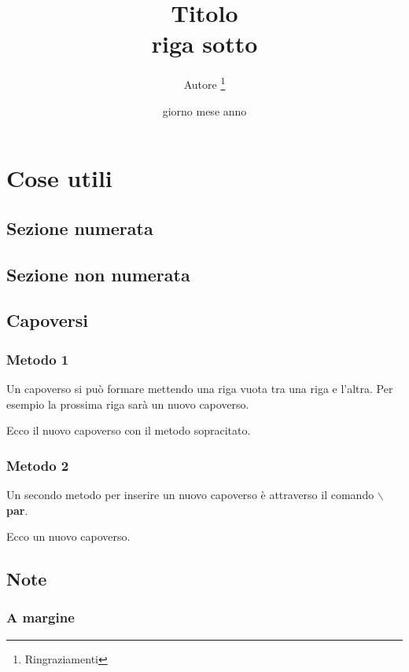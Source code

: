 \documentclass[a4paper, 12pt]{book}
\title{Titolo \\ riga sotto}
\author{Autore \thanks{Ringraziamenti}}
\date{giorno mese anno}
\theoremstyle{plain}
\begin{document}
	\begin{titlepage}
		\maketitle
	\end{titlepage}

	\frontmatter %
	\tableofcontents
	\mainmatter %

	\chapter{Cose utili}
	
	\section{Sezione numerata}
	
	\section*{Sezione non numerata}
	
	\section{Capoversi}
	
	\subsection{Metodo 1}
	
	Un capoverso si può formare mettendo una riga vuota tra una riga e l'altra. Per esempio la prossima riga sarà un nuovo capoverso.
	
	Ecco il nuovo capoverso con il metodo sopracitato.
	
	\subsection{Metodo 2}
	
	 Un secondo metodo per inserire un nuovo capoverso è attraverso il comando \textbf{$\backslash$par}. \par Ecco un nuovo capoverso.
	
	\section{Note}
	
	\subsection{A margine}
	
\end{document}

